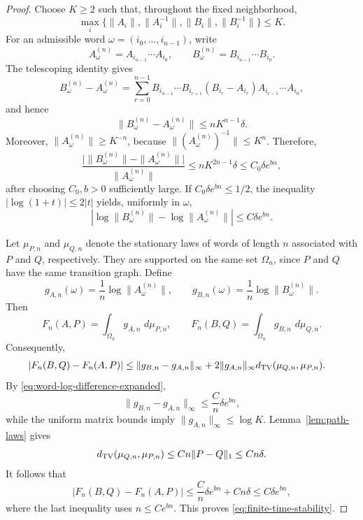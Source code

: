 \documentclass[11pt,a4paper]{amsart}
\theoremstyle{definition}
\theoremstyle{remark}
\numberwithin{equation}{section}
\newcommand{\dd}{\,d}
\newcommand{\1}{\boldsymbol 1}
\begin{document}
\begin{proof}
Choose $K\ge2$ such that, throughout the fixed neighborhood,
$$
 \max_i\{\|A_i\|,\|A_i^{-1}\|,
          \|B_i\|,\|B_i^{-1}\|\}\le K.
$$
For an admissible word
$\omega=(i_0,\ldots,i_{n-1})$, write
$$
 A_\omega^{(n)}=A_{i_{n-1}}\cdots A_{i_0},
 \qquad
 B_\omega^{(n)}=B_{i_{n-1}}\cdots B_{i_0}.
$$
The telescoping identity gives
$$
 B_\omega^{(n)}-A_\omega^{(n)}
 =
 \sum_{r=0}^{n-1}
 B_{i_{n-1}}\cdots B_{i_{r+1}}
 (B_{i_r}-A_{i_r})
 A_{i_{r-1}}\cdots A_{i_0},
$$
and hence
$$
 \|B_\omega^{(n)}-A_\omega^{(n)}\|
 \le nK^{n-1}\delta.
$$
Moreover,
$\|A_\omega^{(n)}\|\ge K^{-n}$, because
$\|(A_\omega^{(n)})^{-1}\|\le K^n$. Therefore,
$$
 \frac{\bigl|\|B_\omega^{(n)}\|
                   -\|A_\omega^{(n)}\|\bigr|}
      {\|A_\omega^{(n)}\|}
 \le nK^{2n-1}\delta
 \le C_0\delta e^{bn},
$$
after choosing $C_0,b>0$ sufficiently large. If
$C_0\delta e^{bn}\le1/2$, the inequality
$|\log(1+t)|\le2|t|$ yields, uniformly in $\omega$,
\begin{equation}\label{eq:word-log-difference-expanded}
 \left|
 \log\|B_\omega^{(n)}\|-\log\|A_\omega^{(n)}\|
 \right|
 \le C\delta e^{bn}.
\end{equation}

Let $\mu_{P,n}$ and $\mu_{Q,n}$ denote the stationary laws of
words of length $n$ associated with $P$ and $Q$, respectively.
They are supported on the same set $\Omega_n$, since $P$ and $Q$
have the same transition graph. Define
$$
 g_{A,n}(\omega)=\frac1n\log\|A_\omega^{(n)}\|,
 \qquad
 g_{B,n}(\omega)=\frac1n\log\|B_\omega^{(n)}\|.
$$
Then
$$
 F_n(A,P)=\int_{\Omega_n}g_{A,n}\,\dd\mu_{P,n},
 \qquad
 F_n(B,Q)=\int_{\Omega_n}g_{B,n}\,\dd\mu_{Q,n}.
$$
Consequently,
\begin{align*}
 |F_n(B,Q)-F_n(A,P)|
 &\le
 \|g_{B,n}-g_{A,n}\|_\infty
 +2\|g_{A,n}\|_\infty
   d_{\rm TV}(\mu_{Q,n},\mu_{P,n}).
\end{align*}
By \eqref{eq:word-log-difference-expanded},
$$
 \|g_{B,n}-g_{A,n}\|_\infty
 \le \frac{C}{n}\delta e^{bn},
$$
while the uniform matrix bounds imply
$\|g_{A,n}\|_\infty\le\log K$. Lemma~\ref{lem:path-laws} gives
$$
 d_{\rm TV}(\mu_{Q,n},\mu_{P,n})
 \le Cn\|P-Q\|_1\le Cn\delta.
$$
It follows that
$$
 |F_n(B,Q)-F_n(A,P)|
 \le \frac{C}{n}\delta e^{bn}+Cn\delta
 \le C\delta e^{bn},
$$
where the last inequality uses $n\le C e^{bn}$. This proves
\eqref{eq:finite-time-stability}.
\end{proof}

\end{document}
